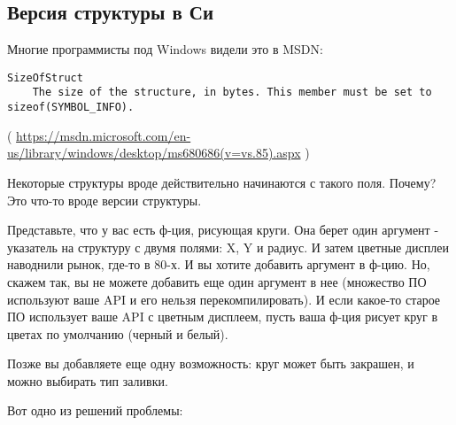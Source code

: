 \subsection{Версия структуры в Си}

Многие программисты под Windows видели это в MSDN:

\begin{lstlisting}
SizeOfStruct
    The size of the structure, in bytes. This member must be set to sizeof(SYMBOL_INFO).
\end{lstlisting}

( \url{https://msdn.microsoft.com/en-us/library/windows/desktop/ms680686(v=vs.85).aspx} )

Некоторые структуры вроде  действительно начинаются с такого поля. Почему?
Это что-то вроде версии структуры.

Представьте, что у вас есть ф-ция, рисующая круги.
Она берет один аргумент - указатель на структуру с двумя полями: X, Y и радиус.
И затем цветные дисплеи наводнили рынок, где-то в 80-х. И вы хотите добавить аргумент  в ф-цию.
Но, скажем так, вы не можете добавить еще один аргумент в нее (множество ПО используют ваше \ac{API} и его нельзя
перекомпилировать).
И если какое-то старое ПО использует ваше \ac{API} с цветным дисплеем,
пусть ваша ф-ция рисует круг в цветах по умолчанию (черный и белый).

Позже вы добавляете еще одну возможность: круг может быть закрашен, и можно выбирать тип заливки.

Вот одно из решений проблемы:

